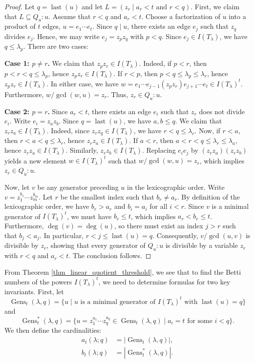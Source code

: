 \documentclass[12pt,amscd]{amsart}
\theoremstyle{definition}
\numberwithin{equation}{section}
\begin{document}
\begin{proof} 
Let $q = \operatorname{last}(u)$ and let $L = (z_r \mid a_r < t \text{ and } r < q)$. 
First, we claim that $L \subseteq Q_u : u$. Assume that $r < q$ and $a_r < t$. Choose a factorization of $u$ into a product of $t$ edges, $u = e_1 \cdots e_t$. Since $q \mid u$, there exists an edge $e_j$ such that $z_q$ divides $e_j$. Hence, we may write $e_j = z_p z_q$ with $p < q$. Since $e_j \in I(T_\lambda)$, we have $q \le \lambda_p$. There are two cases:

\textbf{Case 1: $p \neq r$.} We claim that $z_p z_r \in I(T_\lambda)$. Indeed, if $p < r$, then $p < r < q \le \lambda_p$, hence $z_p z_r \in I(T_\lambda)$. If $r < p$, then $p < q \le \lambda_p \le \lambda_r$, hence $z_p z_r \in I(T_\lambda)$. In either case, we have $w = e_1 \cdots e_{j-1} (z_p z_r) e_{j+1} \cdots e_t \in I(T_\lambda)^t$. Furthermore, $w / \gcd(w,u) = z_r$. Thus, $z_r \in Q_u : u$.

\textbf{Case 2: $p = r$.} Since $a_r < t$, there exists an edge $e_i$ such that $z_r$ does not divide $e_i$. Write $e_i = z_a z_b$. Since $q = \operatorname{last}(u)$, we have $a, b \le q$. We claim that $z_r z_a \in I(T_\lambda)$. Indeed, since $z_r z_q \in I(T_\lambda)$, we have $r < q \le \lambda_r$. Now, if $r < a$, then $r < a < q \le \lambda_r$, hence $z_r z_a \in I(T_\lambda)$. If $a < r$, then $a < r < q \le \lambda_r \le \lambda_a$, hence $z_r z_a \in I(T_\lambda)$. Similarly, $z_r z_b \in I(T_\lambda)$. Replacing $e_i e_j$ by $(z_r z_a)(z_r z_b)$ yields a new element $w \in I(T_\lambda)^t$ such that $w / \gcd(w,u) = z_r$, which implies $z_r \in Q_u : u$.

Now, let $v$ be any generator preceding $u$ in the lexicographic order. Write $v = z_1^{b_1} \cdots z_m^{b_m}$. Let $r$ be the smallest index such that $b_r \neq a_r$. By definition of the lexicographic order, we have $b_r > a_r$ and $b_i = a_i$ for all $i < r$. Since $v$ is a minimal generator of $I(T_\lambda)^t$, we must have $b_r \le t$, which implies $a_r < b_r \le t$. Furthermore, $\deg(v) = \deg(u)$, so there must exist an index $j > r$ such that $b_j < a_j$. In particular, $r < j \le \operatorname{last}(u) = q$. Consequently, $v / \gcd(u,v)$ is divisible by $z_r$, showing that every generator of $Q_u : u$ is divisible by a variable $z_r$ with $r < q$ and $a_r < t$. The conclusion follows.
\end{proof}

From Theorem \ref{thm_linear_quotient_threshold}, we see that to find the Betti numbers of the powers $I(T_\lambda)^t$, we need to determine formulas for two key invariants. 
First, let 
\[
\operatorname{Gens}_t(\lambda, q) = \{ u \mid u \text{ is a minimal generator of } I(T_\lambda)^t \text{ with } \operatorname{last}(u) = q \}
\]
and 
\[
\operatorname{Gens}^*_t(\lambda, q) = \{ u = z_1^{a_1} \cdots z_q^{a_q} \in \operatorname{Gens}_t(\lambda, q) \mid a_i = t \text{ for some } i < q \}.
\]
We then define the cardinalities:
\begin{align*}
    a_t(\lambda; q) &= |\operatorname{Gens}_t(\lambda, q)|, \\
    b_t(\lambda; q) &= |\operatorname{Gens}^*_t(\lambda, q)|.
\end{align*}
\end{document}
